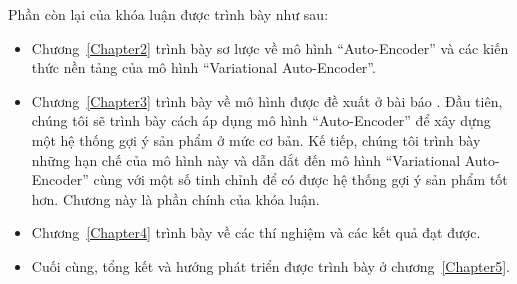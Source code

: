 


Phần còn lại của khóa luận được trình bày như sau:

\begin{itemize}
    \item Chương~\ref{Chapter2} trình bày sơ lược về mô hình ``Auto-Encoder'' và các kiến thức nền tảng của mô hình ``Variational Auto-Encoder''.
    \item Chương~\ref{Chapter3} trình bày về mô hình được đề xuất ở bài báo \cite{mvae}. Đầu tiên, chúng tôi sẽ trình bày cách áp dụng mô hình ``Auto-Encoder'' để xây dựng một hệ thống gợi ý sản phẩm ở mức cơ bản. Kế tiếp, chúng tôi trình bày những hạn chế của mô hình này và dẫn dắt đến mô hình ``Variational Auto-Encoder'' cùng với một số tinh chỉnh để có được hệ thống gợi ý sản phẩm tốt hơn. Chương này là phần chính của khóa luận.  
    \item Chương~\ref{Chapter4} trình bày về các thí nghiệm và các kết quả đạt được.
    \item Cuối cùng, tổng kết và hướng phát triển được trình bày ở chương~\ref{Chapter5}.
\end{itemize}


